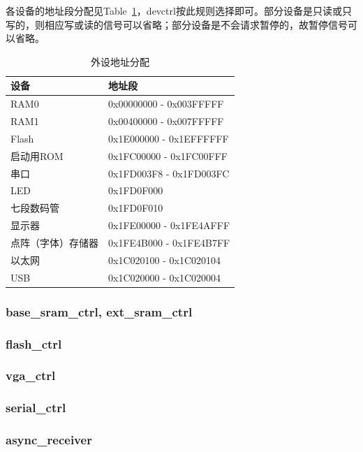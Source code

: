 \documentclass{article}
\begin{document}
\begin{spacing}{1.4}
各设备的地址段分配见Table~\ref{tb:dev-addr}，devctrl按此规则选择即可。部分设备是只读或只写的，则相应写或读的信号可以省略；部分设备是不会请求暂停的，故暂停信号可以省略。
\begin{table}[!htb]
\begin{center}
\begin{tabular}{p{7.5cm}|p{7.5cm}}
\hline
\textbf{设备}&\textbf{地址段} \\
\hline RAM0             & 0x00000000 - 0x003FFFFF \\
\hline RAM1             & 0x00400000 - 0x007FFFFF \\
\hline Flash            & 0x1E000000 - 0x1EFFFFFF \\
\hline 启动用ROM        & 0x1FC00000 - 0x1FC00FFF \\
\hline 串口             & 0x1FD003F8 - 0x1FD003FC \\
\hline LED              & 0x1FD0F000 \\
\hline 七段数码管       & 0x1FD0F010 \\
\hline 显示器           & 0x1FE00000 - 0x1FE4AFFF \\
\hline 点阵（字体）存储器&0x1FE4B000 - 0x1FE4B7FF \\
\hline 以太网           & 0x1C020100 - 0x1C020104 \\
\hline USB              & 0x1C020000 - 0x1C020004 \\
\hline
\end{tabular}
\caption{外设地址分配}
\label{tb:dev-addr}
\end{center}
\end{table}

\subsubsection{base\_sram\_ctrl, ext\_sram\_ctrl}
\subsubsection{flash\_ctrl}
\subsubsection{vga\_ctrl}
\subsubsection{serial\_ctrl}
\subsubsection{async\_receiver}

\end{spacing}
\end{document}
